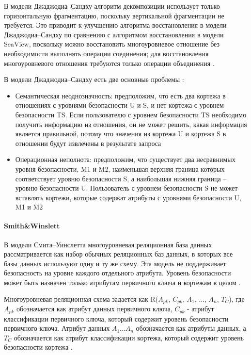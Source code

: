 В модели Джаджодиа–Сандху алгоритм декомпозиции использует только горизонтальную фрагментацию, поскольку 
вертикальной фрагментации не требуется. Это приводит к улучшению алгоритма восстановления в модели Джаджодиа–Сандху 
по сравнению с алгоритмом восстановления в модели SeaView, поскольку можно восстановить многоуровневое отношение 
без необходимости выполнять операции соединения; для восстановления многоуровневого отношения требуются только 
операции объединения \autocite{Osama}.

В модели Джаджодиа–Сандху есть две основные проблемы \autocite{Osama}:
\begin{itemize}
    \item Семантическая неоднозначность: предположим, что есть два кортежа в отношениях с уровнями безопасности 
    U и S, и нет кортежа с уровнем безопасности TS. Если пользователю с уровнем безопасности TS необходимо 
    получить информацию из отношения, он не может решить, какая информация является правильной, потому что 
    значения из кортежа U и кортежа S в отношении будут извлечены в результате запроса
    \item Операционная неполнота: предположим, что существует два несравнимых уровня безопасности, M1 и M2, 
    наименьшая верхняя граница которых соответствует уровню безопасности S, а наибольшая нижняя граница -- 
    уровню безопасности U. Пользователь с уровнем безопасности S не может вставлять кортежи, которые содержат 
    атрибуты с уровнями безопасности U, M1 и M2
\end{itemize}

\paragraph{Smith\&Winslett}

В модели Смита–Уинслетта многоуровневая реляционная база данных рассматривается как набор обычных реляционных 
баз данных, в которых все базы данных используют одну и ту же схему. Эта модель не поддерживает безопасность 
на уровне каждого отдельного атрибута. Уровень безопасности может быть назначен только атрибутам первичного 
ключа и кортежам в целом \autocite{Osama}.

Многоуровневая реляционная схема задается как R($A_{pk}$, $C_{pk}$, $A_1$, ..., $A_{n}$, $T_C$), где $A_{pk}$ обозначается как атрибут данных первичного ключа, $C_{pk}$ - атрибут классификации первичного ключа, который содержит уровень безопасности первичного ключа. Атрибут данных $A_{1} ... A_{n}$ обозначается как атрибуты данных, а $T_C$ обозначается как атрибут классификации кортежа, который содержит уровень безопасности кортежа \autocite{Osama}.

